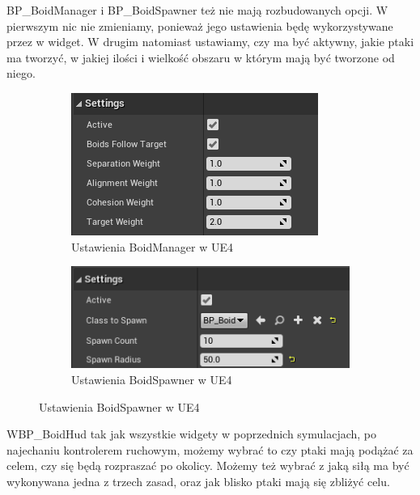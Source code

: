 \documentclass[a4paper,12pt,reqno]{article}
\begin{document}
BP\_BoidManager i BP\_BoidSpawner też nie mają rozbudowanych opcji. W pierwszym nic nie zmieniamy, ponieważ jego ustawienia będę wykorzystywane przez w widget. W drugim natomiast ustawiamy, czy ma być aktywny, jakie ptaki ma tworzyć, w jakiej ilości i wielkość obszaru w którym mają być tworzone od niego.

\begin{figure}[!ht]%
	\centering
	\begin{subfigure}{.5\textwidth}
		\centering
		\includegraphics[width=0.9\linewidth]{graphics//boids/BP_BoidManager.png}
		\caption{Ustawienia BoidManager w UE4 }	
		\label{ref:subref_a}
	\end{subfigure}%
	\begin{subfigure}{.5\textwidth}
		\centering
		\includegraphics[width=0.9\linewidth]{graphics//boids/BP_BoidSpawner.png}
		\caption{Ustawienia BoidSpawner w UE4 }
		\label{ref:subref_b}
	\end{subfigure}%
\label{ref:ref}
\end{figure}

WBP\_BoidHud tak jak wszystkie widgety w poprzednich symulacjach, po najechaniu kontrolerem ruchowym, możemy wybrać to czy ptaki mają podążać za celem, czy się będą rozpraszać po okolicy. Możemy też wybrać z jaką siłą ma być wykonywana jedna z trzech zasad, oraz jak blisko ptaki mają się zbliżyć celu. 
\end{document}

